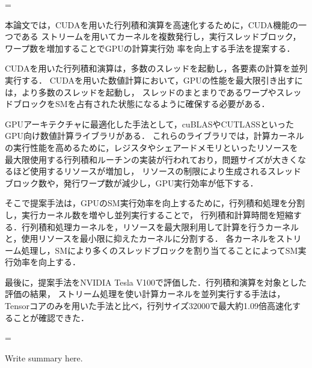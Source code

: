 ={

本論文では，CUDAを用いた行列積和演算を高速化するために，CUDA機能の一つである
ストリームを用いてカーネルを複数発行し，実行スレッドブロック，ワープ数を増加することでGPUの計算実行効
率を向上する手法を提案する．

CUDAを用いた行列積和演算は，多数のスレッドを起動し，各要素の計算を並列実行する．
CUDAを用いた数値計算において，GPUの性能を最大限引き出すには，より多数のスレッドを起動し，
スレッドのまとまりであるワープやスレッドブロックをSMを占有された状態になるように確保する必要がある．

GPUアーキテクチャに最適化した手法として，cuBLASやCUTLASSといったGPU向け数値計算ライブラリがある．
 これらのライブラリでは，計算カーネルの実行性能を高めるために，レジスタやシェアードメモリといったリソースを
 最大限使用する行列積和ルーチンの実装が行われており，問題サイズが大きくなるほど使用するリソースが増加し，
リソースの制限により生成されるスレッドブロック数や，発行ワープ数が減少し，GPU実行効率が低下する．

そこで提案手法は，GPUのSM実行効率を向上するために，行列積和処理を分割し，実行カーネル数を増やし並列実行することで，
行列積和計算時間を短縮する．行列積和処理カーネルを，リソースを最大限利用して計算を行うカーネルと，使用リソースを最小限に抑えたカーネルに分割する．
各カーネルをストリーム処理し，SMにより多くのスレッドブロックを割り当てることによってSM実行効率を向上する．

 最後に，提案手法をNVIDIA Tesla V100で評価した．行列積和演算を対象とした評価の結果，
 ストリーム処理を使い計算カーネルを並列実行する手法は，Tensorコアのみを用いた手法と比べ，行列サイズ32000で最大約1.09倍高速化することが確認できた．
}%


={

Write summary here.

}%

